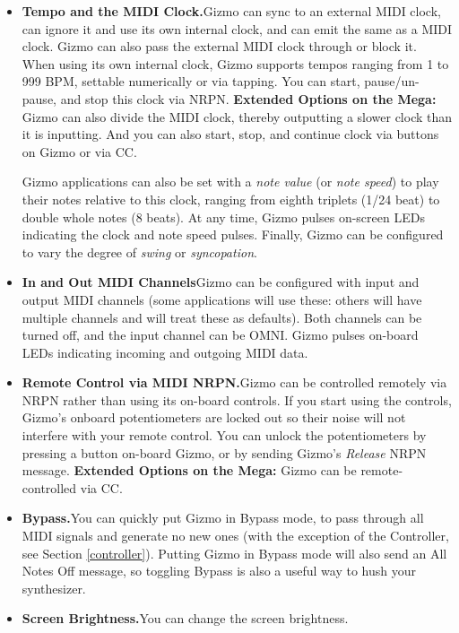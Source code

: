 \documentclass{article}
\begin{document}
\begin{itemize}
\item {\bf Tempo and the MIDI Clock.}\quad Gizmo can sync to an external MIDI clock, can ignore it and use its own internal clock, and can emit the same as a MIDI clock.  Gizmo can also pass the external MIDI clock through or block it.  When using its own internal clock, Gizmo supports tempos ranging from 1 to 999 BPM, settable numerically or via tapping.  You can start, pause/un-pause, and stop this clock via NRPN.  {\bf Extended Options on the Mega:} Gizmo can also divide the MIDI clock, thereby outputting a slower clock than it is inputting.  And you can also start, stop, and continue clock via buttons on Gizmo or via CC.

Gizmo applications can also be set with a {\it note value} (or {\it note speed}) to play their notes relative to this clock, ranging from eighth triplets (1/24 beat) to double whole notes (8 beats).  At any time, Gizmo pulses on-screen LEDs indicating the clock and note speed pulses.  Finally, Gizmo can be configured to vary the degree of {\it swing} or {\it syncopation}.

\item {\bf In and Out MIDI Channels}\quad Gizmo can be configured with input and output MIDI channels (some applications will use these: others will have multiple channels and will treat these as defaults).  Both channels can be turned off, and the input channel can be OMNI.  Gizmo pulses on-board LEDs indicating incoming and outgoing MIDI data.  

\item {\bf Remote Control via MIDI NRPN.}\quad Gizmo can be controlled remotely via NRPN rather than using its on-board controls.  If you start using the controls, Gizmo's onboard potentiometers are locked out so their noise will not interfere with your remote control.  You can unlock the potentiometers by pressing a button on-board Gizmo, or by sending Gizmo's {\it Release} NRPN message.  {\bf Extended Options on the Mega:} Gizmo can be remote-controlled via CC.

\item {\bf Bypass.}\quad You can quickly put Gizmo in Bypass mode, to pass through all MIDI signals and generate no new ones (with the exception of the Controller, see Section \ref{controller}).  Putting Gizmo in Bypass mode will also send an All Notes Off message, so toggling Bypass is also a useful way to hush your synthesizer.

\item {\bf Screen Brightness.}\quad You can change the screen brightness.  


\end{itemize}
\end{document}
